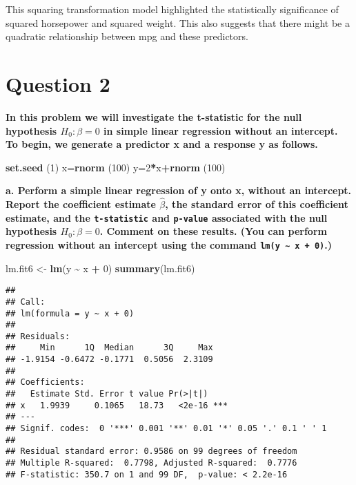 \documentclass[
]{article}
\newenvironment{Shaded}{\begin{snugshade}}{\end{snugshade}}
\newcommand{\DecValTok}[1]{\textcolor[rgb]{0.00,0.00,0.81}{#1}}
\newcommand{\FunctionTok}[1]{\textcolor[rgb]{0.13,0.29,0.53}{\textbf{#1}}}
\newcommand{\NormalTok}[1]{#1}
\newcommand{\OtherTok}[1]{\textcolor[rgb]{0.56,0.35,0.01}{#1}}
\newcommand{\SpecialCharTok}[1]{\textcolor[rgb]{0.81,0.36,0.00}{\textbf{#1}}}
\begin{document}
This squaring transformation model highlighted the statistically
significance of squared horsepower and squared weight. This also
suggests that there might be a quadratic relationship between mpg and
these predictors.

\hypertarget{question-2}{%
\section{Question 2}\label{question-2}}

\textbf{In this problem we will investigate the t-statistic for the null
hypothesis \(H_0 : \beta = 0\) in simple linear regression without an
intercept. To begin, we generate a predictor x and a response y as
follows.}

\begin{Shaded}
\begin{Highlighting}[]
\FunctionTok{set.seed}\NormalTok{ (}\DecValTok{1}\NormalTok{)}
\NormalTok{x}\OtherTok{=}\FunctionTok{rnorm}\NormalTok{ (}\DecValTok{100}\NormalTok{)}
\NormalTok{y}\OtherTok{=}\DecValTok{2}\SpecialCharTok{*}\NormalTok{x}\SpecialCharTok{+}\FunctionTok{rnorm}\NormalTok{ (}\DecValTok{100}\NormalTok{)}
\end{Highlighting}
\end{Shaded}

\textbf{a. Perform a simple linear regression of y onto x, without an
intercept. Report the coefficient estimate \(\hat\beta\), the standard
error of this coefficient estimate, and the \texttt{t-statistic} and
\texttt{p-value} associated with the null hypothesis
\(H_0 : \beta = 0\). Comment on these results. (You can perform
regression without an intercept using the command
\texttt{lm(y\ ∼\ x\ +\ 0)}.)}

\begin{Shaded}
\begin{Highlighting}[]
\NormalTok{lm.fit6 }\OtherTok{\textless{}{-}} \FunctionTok{lm}\NormalTok{(y }\SpecialCharTok{\textasciitilde{}}\NormalTok{ x }\SpecialCharTok{+} \DecValTok{0}\NormalTok{)}
\FunctionTok{summary}\NormalTok{(lm.fit6)}
\end{Highlighting}
\end{Shaded}

\begin{verbatim}
## 
## Call:
## lm(formula = y ~ x + 0)
## 
## Residuals:
##     Min      1Q  Median      3Q     Max 
## -1.9154 -0.6472 -0.1771  0.5056  2.3109 
## 
## Coefficients:
##   Estimate Std. Error t value Pr(>|t|)    
## x   1.9939     0.1065   18.73   <2e-16 ***
## ---
## Signif. codes:  0 '***' 0.001 '**' 0.01 '*' 0.05 '.' 0.1 ' ' 1
## 
## Residual standard error: 0.9586 on 99 degrees of freedom
## Multiple R-squared:  0.7798, Adjusted R-squared:  0.7776 
## F-statistic: 350.7 on 1 and 99 DF,  p-value: < 2.2e-16
\end{verbatim}
\end{document}
